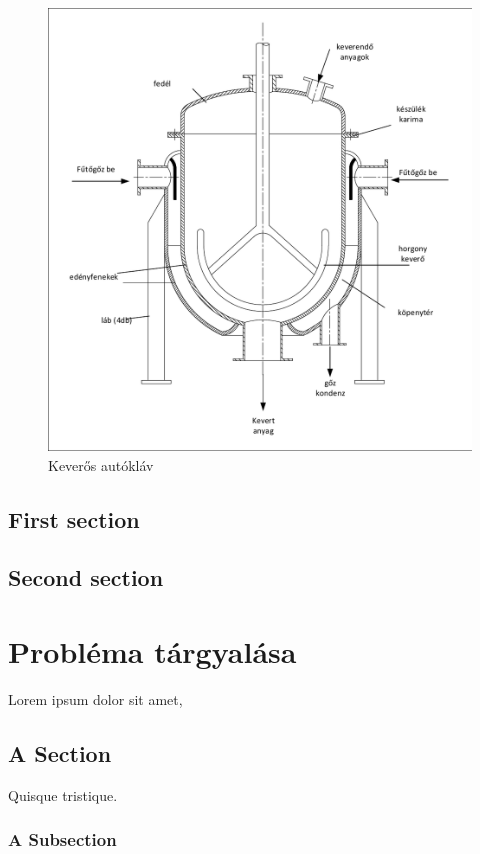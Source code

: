 \documentclass[a4paper,12pt,oneside]{book}
\begin{document}
\begin{figure}[H]
	\centering
	\includegraphics[scale=1, trim=1mm 1mm 1mm 1mm, clip]{kep1}
	\caption{Keverős autókláv}
	\label{kep1356}
\end{figure}
\fi



\section{First section}

\section{Second section}

\chapter{Probléma tárgyalása}
Lorem ipsum dolor sit amet,

\section{A Section}

Quisque tristique.

\subsection{A Subsection}
\end{document}
